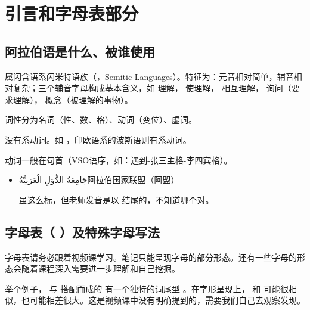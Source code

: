 \chapter{引言和字母表部分}

\section{  阿拉伯语是什么、被谁使用}

属闪含语系闪米特语族（，Semitic Languages）。特征为：元音相对简单，辅音相对复杂；三个辅音字母构成基本含义，如  理解， 使理解，  相互理解，  询问（要求理解），  概念（被理解的事物）。

词性分为名词（性、数、格）、动词（变位）、虚词。

没有系动词。如  ，印欧语系的波斯语则有系动词。

动词一般在句首（VSO语序，如：遇到-张三主格-李四宾格）。

\begin{itemize}
    \item \ac{جَامِعَةُ الدُّوَلِ الْعَرَبِيَّةُ}{阿拉伯国家联盟（阿盟）}
    \begin{note}
    虽这么标，但老师发音是以  结尾的，不知道哪个对。
    \end{note}
\end{itemize}

\section{ 字母表（  ）及特殊字母写法}

\label{table:alphabet}

\begin{note}
    字母表请务必跟着视频课学习。笔记只能呈现字母的部分形态。还有一些字母的形态会随着课程深入需要进一步理解和自己挖掘。

    举个例子， 与  搭配而成的  有一个独特的词尾型 。在字形呈现上，  和  可能很相似，也可能相差很大。这是视频课中没有明确提到的，需要我们自己去观察发现。
\end{note}

\newfontfamily{}

